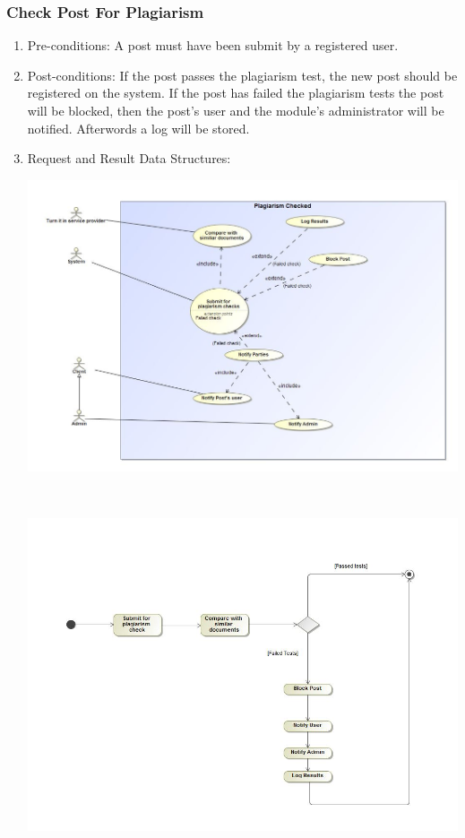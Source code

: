\documentclass[hidelinks, 12pt, oneside]{article}
\begin{document}
\subsubsection{Check Post For Plagiarism}
\begin{enumerate}
 \item Pre-conditions: A post must have been submit by a registered user. 

 
 \item Post-conditions: If the post passes the plagiarism test, the new post should be registered on the system. If the post has failed the plagiarism tests the post will be blocked, then the post's user and the module's administrator will be notified. Afterwords a log will be stored. 

 \item Request and Result Data Structures:\\
  \centerline{\includegraphics[scale=0.4]{plagiarismCheckUC}}\\
 \centerline{\includegraphics[scale=0.35]{plagiarismCheckAD}} 
\end{enumerate}
\end{document}
